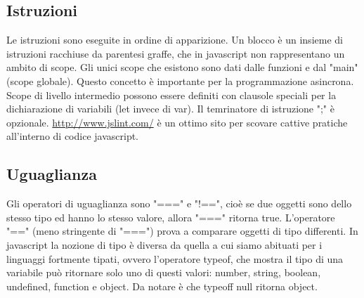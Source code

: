 \subsection{Istruzioni}
Le istruzioni sono eseguite in ordine di apparizione.\newline
\newline
Un blocco è un insieme di istruzioni racchiuse da parentesi graffe, che in javascript non rappresentano un ambito di scope. Gli unici scope che esistono sono dati dalle funzioni e dal "main" (scope globale). Questo concetto è importante per la programmazione asincrona.\newline
\newline
Scope di livello intermedio possono essere definiti con clausole speciali per la dichiarazione di variabili (let invece di var).\newline
\newline
Il temrinatore di istruzione ";" è opzionale.\newline
\newline
\url{http://www.jslint.com/} è un ottimo sito per scovare cattive pratiche all'interno di codice javascript.
\subsection{Uguaglianza}
Gli operatori di uguaglianza sono "===" e "!==", cioè se due oggetti sono dello stesso tipo ed hanno lo stesso valore, allora "===" ritorna true.\newline
\newline
L'operatore "==" (meno stringente di "===") prova a comparare oggetti di tipo differenti.\newline
\newline
In javascript la nozione di tipo è diversa da quella a cui siamo abituati per i linguaggi fortmente tipati, ovvero l'operatore typeof, che mostra il tipo di una variabile può ritornare solo uno di questi valori: number, string, boolean, undefined, function e object. Da notare è che typeoff null ritorna object.
